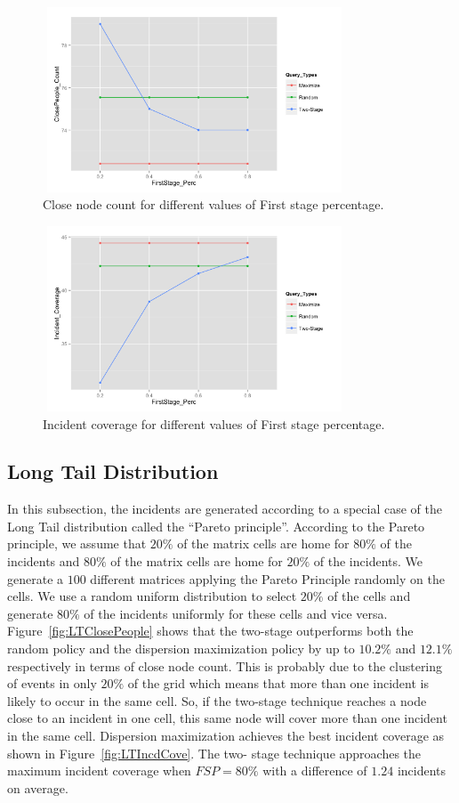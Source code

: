 \documentclass{acm_proc_article-sp}
\begin{document}
\begin{figure}[!h]
\centering
 \includegraphics[width=9cm ,height=5.5cm]{figuresPng/Uni_ClosePeople_Count.png}
 \caption{Close node count for different values of First stage percentage. }
 \label{fig:uniClosePeople}
\end{figure}
\begin{figure}[!h]
\centering
 \includegraphics[width=9cm ,height=5.5cm]{figuresPng/Uni-Inc_Coverage.png}
 \caption{Incident coverage for different values of First stage percentage. }
 \label{fig:uniIncdCove}
\end{figure}

\subsection{Long Tail Distribution}
In this subsection, the incidents are generated according to a special case of the Long Tail distribution called the ``Pareto principle''. According to the Pareto principle, we assume that $20\%$ of the matrix cells are home for $80\%$ of the incidents and $80\%$ of the matrix cells are home for $20\%$ of the incidents. We generate a $100$ different matrices applying the Pareto Principle randomly on the cells. We use a random uniform distribution to select $20\%$ of the cells and generate $80\%$ of the incidents uniformly for these cells and vice versa. Figure~\ref{fig:LTClosePeople} shows that the two-stage outperforms both the random policy and the dispersion maximization policy by up to $10.2\%$ and $12.1\%$ respectively in terms of close node count. This is probably due to the clustering of events in only $20\%$ of the grid which means that more than one incident is likely to occur in the same cell. So, if the two-stage technique reaches a node close to an incident in one cell, this same node will cover more than one incident in the same cell. Dispersion maximization achieves the best incident coverage as shown in Figure~\ref{fig:LTIncdCove}. The two- stage technique approaches the maximum incident coverage when $FSP = 80\%$ with a difference of $1.24$ incidents on average.
\end{document}
